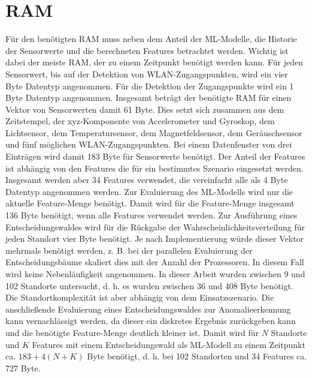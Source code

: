 \section{RAM}
Für den benötigten RAM muss neben dem Anteil der ML-Modelle, die Historie der Sensorwerte und die berechneten Features betrachtet werden.
Wichtig ist dabei der meiste RAM, der zu einem Zeitpunkt benötigt werden kann.
\newline
\newline
Für jeden Sensorwert, bis auf der Detektion von WLAN-Zugangspunkten, wird ein vier Byte Datentyp angenommen.
Für die Detektion der Zugangspunkte wird ein 1 Byte Datentyp angenommen.
Insgesamt beträgt der benötigte RAM für einen Vektor von Sensorwerten damit 61 Byte.
Dies setzt sich zusammen aus dem Zeitstempel, der xyz-Komponente von Accelerometer und Gyroskop, dem Lichtsensor,
dem Temperatursensor, dem Magnetfeldsensor, dem Geräuschsensor und fünf möglichen WLAN-Zugangspunkten.
Bei einem Datenfenster von drei Einträgen wird damit 183 Byte für Sensorwerte benötigt.
\newline
\newline
Der Anteil der Features ist abhängig von den Features die für ein bestimmtes Szenario eingesetzt werden.
Insgesamt werden aber 34 Features verwendet, die vereinfacht alle als 4 Byte Datentyp angenommen werden.
Zur Evaluierung des ML-Modells wird nur die aktuelle Feature-Menge benötigt.
Damit wird für die Feature-Menge insgesamt 136 Byte benötigt, wenn alle Features verwendet werden.
\newline
\newline
Zur Ausführung eines Entscheidungswaldes wird für die Rückgabe der Wahrscheinlichkeitsverteilung für jeden Standort vier Byte benötigt.
Je nach Implementierung würde dieser Vektor mehrmals benötigt werden, z. B. bei der parallelen Evaluierung der Entscheidungsbäume skaliert dies mit der Anzahl der Prozessoren.
In diesem Fall wird keine Nebenläufigkeit angenommen.
In dieser Arbeit wurden zwischen 9 und 102 Standorte untersucht, d. h. es wurden zwischen 36 und 408 Byte benötigt.
Die Standortkomplexität ist aber abhängig von dem Einsatzszenario.
Die anschließende Evaluierung eines Entscheidungswaldes zur Anomalieerkennung kann vernachlässigt werden,
da dieser ein diskretes Ergebnis zurückgeben kann und die benötigte Feature-Menge deutlich kleiner ist.
Damit wird für $N$ Standorte und $K$ Features mit einem Entscheidungswald als ML-Modell zu einem Zeitpunkt
ca. $183 + 4(N + K)$ Byte benötigt, d. h. bei 102 Standorten und 34 Features ca. 727 Byte.
